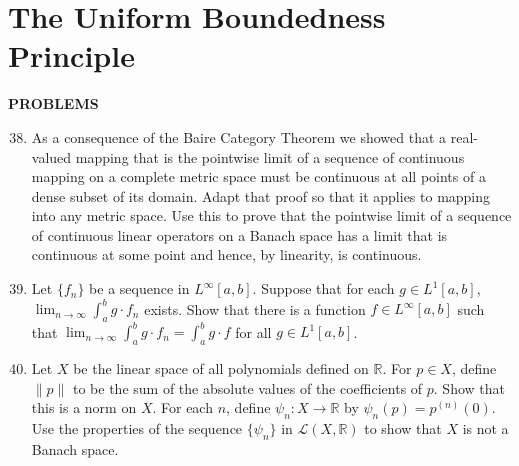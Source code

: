 \section{The Uniform Boundedness Principle}
\begin{center}
	\textbf{PROBLEMS}
\end{center}
\begin{enumerate}
	\setcounter{enumi}{37}
    \item As a consequence of the Baire Category Theorem we showed that a real-valued mapping that is the pointwise limit of a sequence of continuous mapping on a complete metric space must be continuous at all points of a dense subset of its domain.
    Adapt that proof so that it applies to mapping into any metric space.
    Use this to prove that the pointwise limit of a sequence of continuous linear operators on a Banach space has a limit that is continuous at some point and hence, by linearity, is continuous.
    \item Let $\{f_n\}$ be a sequence in $L^\infty[a,b]$.
    Suppose that for each $g\in L^1[a,b]$, $\lim_{n\to\infty}\int_a^bg\cdot f_n$ exists.
    Show that there is a function $f\in L^\infty[a,b]$ such that $\lim_{n\to\infty}\int_a^bg\cdot f_n=\int_a^bg\cdot f$ for all $g\in L^1[a,b]$.
    \item Let $X$ be the linear space of all polynomials defined on $\mathbb{R}$.
    For $p\in X$, define $\|p\|$ to be the sum of the absolute values of the coefficients of $p$.
    Show that this is a norm on $X$.
    For each $n$, define $\psi_n:X\to\mathbb{R}$ by $\psi_n(p)=p^{(n)}(0)$.
    Use the properties of the sequence $\{\psi_n\}$ in $\mathcal{L}(X,\mathbb{R})$ to show that $X$ is not a Banach space.
\end{enumerate}
